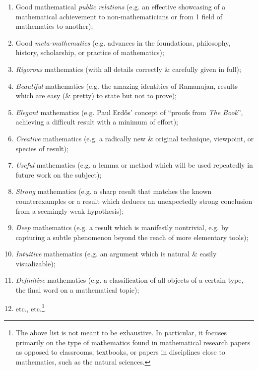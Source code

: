\documentclass[oneside]{book}
\numberwithin{equation}{section}
\begin{document}
\begin{enumerate}
	\item Good mathematical \textit{public relations} (e.g. an effective showcasing of a mathematical achievement to non-mathematicians or from 1 field of mathematics to another);
	\item Good \textit{meta-mathematics} (e.g. advances in the foundations, philosophy, history, scholarship, or practice of mathematics);
	\item \textit{Rigorous} mathematics (with all details correctly \& carefully given in full);
	\item \textit{Beautiful} mathematics (e.g. the amazing identities of Ramanujan, results which are easy (\& pretty) to state but not to prove);
	\item \textit{Elegant} mathematics (e.g. Paul Erd\H{o}s' concept of ``proofs from \textit{The Book}'', achieving a difficult result with a minimum of effort);
	\item \textit{Creative} mathematics (e.g. a radically new \& original technique, viewpoint, or species of result);
	\item \textit{Useful} mathematics (e.g. a lemma or method which will be used repeatedly in future work on the subject);
	\item \textit{Strong} mathematics (e.g. a sharp result that matches the known counterexamples or a result which deduces an unexpectedly strong conclusion from a seemingly weak hypothesis);
	\item \textit{Deep} mathematics (e.g. a result which is manifestly nontrivial, e.g. by capturing a subtle phenomenon beyond the reach of more elementary tools);
	\item \textit{Intuitive} mathematics (e.g. an argument which is natural \& easily visualizable);
	\item \textit{Definitive} mathematics (e.g. a classification of all objects of a certain type, the final word on a mathematical topic);
	\item etc., etc.\footnote{The above list is not meant to be exhaustive. In particular, it focuses primarily on the type of mathematics found in mathematical research papers as opposed to classrooms, textbooks, or papers in disciplines close to mathematics, such as the natural sciences.}
\end{enumerate}
\end{document}
